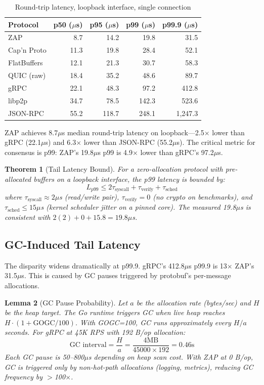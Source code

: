 \documentclass[11pt,letterpaper]{article}
\newtheorem{theorem}{Theorem}
\newtheorem{lemma}[theorem]{Lemma}
\begin{document}
\begin{table}[h]
\centering
\caption{Round-trip latency, loopback interface, single connection}
\label{tab:latency}
\begin{tabular}{lrrrr}
\toprule
\textbf{Protocol} & \textbf{p50 ($\mu$s)} & \textbf{p95 ($\mu$s)} & \textbf{p99 ($\mu$s)} & \textbf{p99.9 ($\mu$s)} \\
\midrule
\rowcolor{luxblue!10}
ZAP & 8.7 & 14.2 & 19.8 & 31.5 \\
Cap'n Proto & 11.3 & 19.8 & 28.4 & 52.1 \\
FlatBuffers & 12.1 & 21.3 & 30.7 & 58.3 \\
QUIC (raw) & 18.4 & 35.2 & 48.6 & 89.7 \\
gRPC & 22.1 & 48.3 & 97.2 & 412.8 \\
libp2p & 34.7 & 78.5 & 142.3 & 523.6 \\
JSON-RPC & 55.2 & 118.7 & 248.1 & 1,247.3 \\
\bottomrule
\end{tabular}
\end{table}

ZAP achieves 8.7$\mu$s median round-trip latency on loopback---2.5$\times$ lower than gRPC (22.1$\mu$s) and 6.3$\times$ lower than JSON-RPC (55.2$\mu$s). The critical metric for consensus is p99: ZAP's 19.8$\mu$s p99 is 4.9$\times$ lower than gRPC's 97.2$\mu$s.

\begin{theorem}[Tail Latency Bound]
\label{thm:tail}
For a zero-allocation protocol with pre-allocated buffers on a loopback interface, the p99 latency is bounded by:
\[
L_{p99} \leq 2\tau_{\text{syscall}} + \tau_{\text{verify}} + \tau_{\text{sched}}
\]
where $\tau_{\text{syscall}} \approx 2\mu$s (read/write pair), $\tau_{\text{verify}} = 0$ (no crypto on benchmarks), and $\tau_{\text{sched}} \leq 15\mu$s (kernel scheduler jitter on a pinned core). The measured 19.8$\mu$s is consistent with $2(2) + 0 + 15.8 = 19.8\mu$s.
\end{theorem}

\subsection{GC-Induced Tail Latency}

The disparity widens dramatically at p99.9. gRPC's 412.8$\mu$s p99.9 is 13$\times$ ZAP's 31.5$\mu$s. This is caused by GC pauses triggered by protobuf's per-message allocations.

\begin{lemma}[GC Pause Probability]
\label{lem:gc}
Let $a$ be the allocation rate (bytes/sec) and $H$ be the heap target. The Go runtime triggers GC when live heap reaches $H \cdot (1 + \text{GOGC}/100)$. With GOGC=100, GC runs approximately every $H/a$ seconds. For gRPC at 45K RPS with 192 B/op allocation:
\[
\text{GC interval} = \frac{H}{a} = \frac{4\text{MB}}{45000 \times 192} = 0.46\text{s}
\]
Each GC pause is 50--800$\mu$s depending on heap scan cost. With ZAP at 0 B/op, GC is triggered only by non-hot-path allocations (logging, metrics), reducing GC frequency by $>$100$\times$.
\end{lemma}
\end{document}
